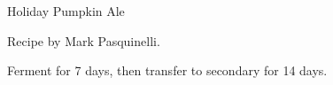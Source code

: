 \stylesection{\stylewinterseasonalbeer}

\begin{recipe}{Holiday Pumpkin Ale} %

\begin{aboutblock}
Recipe by Mark Pasquinelli. \sourceaha
\end{aboutblock}


\begin{methodandtiming}
 
\begin{mashsteps}
\end{mashsteps}

\begin{directions}
Ferment for 7 days, then transfer to secondary for 14 days.
\end{directions}

\end{methodandtiming}

\recipebreak

\begin{ingredientsblock}

\begin{malts}
\end{malts}

\begin{hops}
\end{hops}

\begin{twists}
\end{twists}


\end{ingredientsblock}

\end{recipe}
